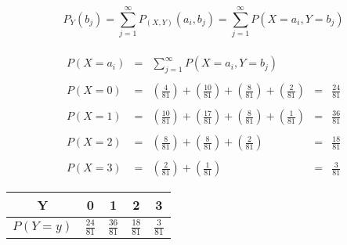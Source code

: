 \documentclass[12pt]{article}
\begin{document}
\begin{equation*}
    P_Y\left(b_j\right) =  \sum_{j=1}^{\infty} P_{\left(X,Y\right)} \left(a_i, b_j\right)
                             =  \sum_{j=1}^{\infty} P\left(X=a_i,Y=b_j\right)
\end{equation*}

\begin{equation*}
    \begin{array}{rclcl}
        \\
        \displaystyle P\left(X = a_i\right) & = & \displaystyle \sum_{j=1}^{\infty} P \left(X = a_i,Y = b_j\right)
        \\
        \\
        \displaystyle P\left(X = 0\right)   & = & \displaystyle \left( \frac{4}{81}\right) + \left(\frac{10}{81}\right) + \left(\frac{8}{81}\right) +\left( \frac{2}{81}\right)     & = &  \displaystyle \frac{24}{81}
        \\
        \\
        \displaystyle  P\left(X = 1\right)   & = & \displaystyle \left(\frac{10}{81}\right) + \left(\frac{17}{81}\right) + \left(\frac{8}{81}\right)  + \left(\frac{1}{81}\right)   & = & \displaystyle \frac{36}{81}
        \\
        \\
        \displaystyle P\left(X = 2\right)   & = & \displaystyle \left(\frac{8}{81}\right) + \left(\frac{8}{81}\right) + \left(\frac{2}{81}\right)                                           & = & \displaystyle \frac{18}{81}
        \\
        \\
        \displaystyle P\left(X = 3\right)   & = & \displaystyle  \left(\frac{2}{81}\right) + \left(\frac{1}{81}\right)                                                                 & = & \displaystyle \frac{3}{81}
    \end{array}
\end{equation*}


\begin{center}
    \renewcommand{\arraystretch}{1.5}
    \begin{tabular}{|c|c|c|c|c|}
        \hline
        Y                   & 0               & 1               & 2               & 3
        \\
        \hline
        $P\left(Y=y\right)$ & $\frac{24}{81}$ & $\frac{36}{81}$ & $\frac{18}{81}$ & $\frac{3}{81}$
        \\
        \hline
    \end{tabular}
\end{center}
\end{document}
